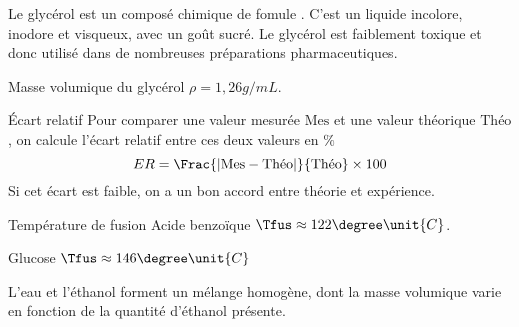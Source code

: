 \begin{doc}{}
  \vspace*{-1.2cm}
  \begin{wrapfigure}{r}{0.2\linewidth}
  \end{wrapfigure}
  
  Le glycérol est un composé chimique de fomule . C'est un liquide incolore, inodore et visqueux, avec un goût sucré. 
  Le glycérol est faiblement toxique et donc utilisé dans de nombreuses préparations pharmaceutiques.
  
  Masse volumique du glycérol $\rho = 1,26 \unit{g / mL}$.
\end{doc}


\begin{multicols}{2}
\begin{doc}{Écart relatif}
  Pour comparer une valeur mesurée $\text{Mes}$ et une valeur théorique $\text{Théo}$, on calcule l'écart relatif entre ces deux valeurs en $\%$
  \begin{equation*}
    ER = \Frac{|\text{Mes} - \text{Théo}|}{\text{Théo}} \times 100
  \end{equation*}
  Si cet écart est faible, on a un bon accord entre théorie et expérience.
\end{doc}

\begin{doc}{Température de fusion}
  Acide benzoïque $\Tfus \approx 122\degree\unit{C}$.
  
  Glucose $\Tfus \approx 146\degree\unit{C}$
\end{doc}

\begin{doc}{}
  L'eau et l'éthanol forment un mélange homogène, dont la masse volumique varie en fonction de la quantité d'éthanol présente.
  \begin{center}
  \end{center}
\end{doc}
\end{multicols}


